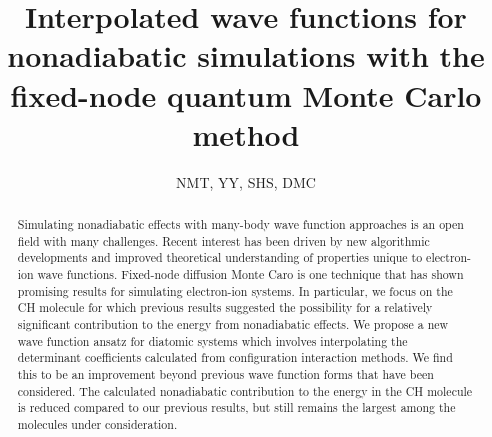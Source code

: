 \documentclass[aip,jcp,numerical,reprint]{revtex4-1}
\begin{document}
\title{Interpolated wave functions for nonadiabatic simulations with the fixed-node quantum Monte Carlo method}
\author{NMT, YY, SHS, DMC}

\begin{abstract}
Simulating nonadiabatic effects with many-body wave function approaches is an open field with many challenges.  %
Recent interest has been driven by new algorithmic developments and improved theoretical understanding of properties unique to electron-ion wave functions.  Fixed-node diffusion Monte Caro is one technique that has shown promising results for simulating electron-ion systems.
In particular, we focus on the CH molecule for which previous results suggested the possibility for a relatively significant contribution to the energy from nonadiabatic effects.  We propose a new wave function ansatz for diatomic systems which involves interpolating the determinant coefficients calculated from configuration interaction methods.    We find this to be an improvement beyond previous wave function forms that have been considered.    The calculated nonadiabatic contribution to the energy in the CH molecule is reduced compared to our previous results, but still remains the largest among the molecules under consideration.

\end{abstract}
\maketitle
\end{document}

